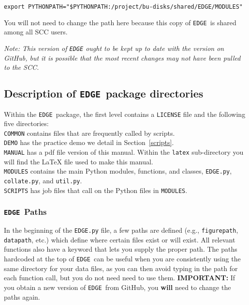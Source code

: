\documentclass{article}
\newcommand{\edge}{\texttt{EDGE }}
\begin{document}
\vspace{2mm}
\noindent \texttt{export PYTHONPATH="\${PYTHONPATH}:/project/bu-disks/shared/EDGE/MODULES"}
\vspace{2mm}

\noindent You will not need to change the path here because this copy of \edge is shared among all SCC users.

\vspace{2mm}
\noindent \textit{Note: This version of \texttt{EDGE} ought to be kept up to date with the version on GitHub, but it is possible that the most recent changes may not have been pulled to the SCC.} 

\subsection{Description of \edge package directories} \label{edgepackage}

\noindent Within the \edge package, the first level contains a \texttt{LICENSE} file and the following five directories:\\

\noindent \texttt{COMMON} contains files that are frequently called by scripts.
\\
\noindent \texttt{DEMO} has the practice demo we detail in Section~\ref{scripts}.
\\
\noindent \texttt{MANUAL} has a pdf file version of this manual.  Within the \texttt{latex} sub-directory you will find the LaTeX file used to make this manual.
\\
\noindent \texttt{MODULES} contains the main Python modules, functions, and classes, \texttt{EDGE.py}, \texttt{collate.py}, and  \texttt{util.py}.
\\
\noindent \texttt{SCRIPTS} has job files that call on the Python files in \texttt{MODULES}.


\subsubsection{\edge Paths} \label{paths}
\noindent In the beginning of the \texttt{EDGE.py} file, a few paths are defined (e.g., \texttt{figurepath}, \texttt{datapath}, etc.) which define where certain files exist or will exist. All relevant functions also have a keyword that lets you supply the proper path. The paths hardcoded at the top of \edge can be useful when you are consistently using the same directory for your data files, as you can then avoid typing in the path for each function call, but you do not need need to use them. \textbf{IMPORTANT:} If you obtain a new version of \edge from GitHub, you \textbf{will} need to change the paths again. 
\end{document}

